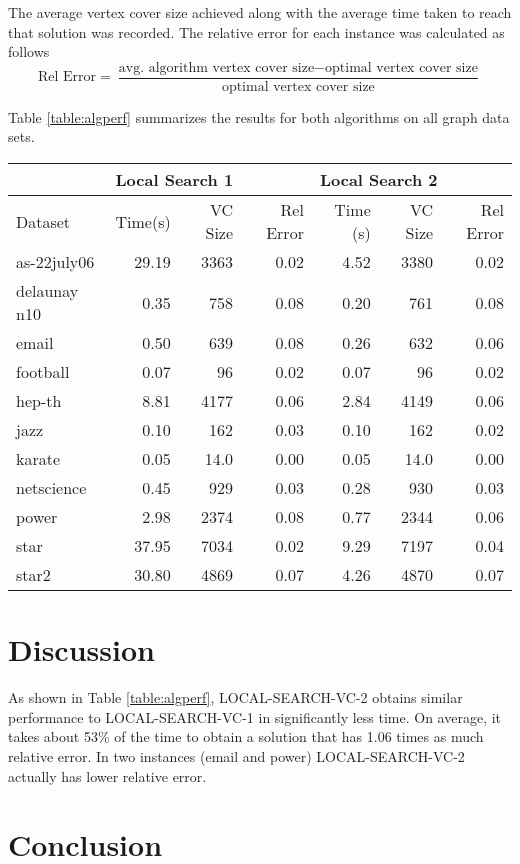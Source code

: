 \documentclass[sigconf]{acmart}
\begin{document}
The average vertex cover size achieved along with the average time taken to reach that solution was recorded. The relative error for each instance was calculated as follows
\begin{equation*}
	\textrm{Rel Error} = \frac{\textrm{avg. algorithm vertex cover size} - \textrm{optimal vertex cover size}}{\textrm{optimal vertex cover size}}
\end{equation*} 

Table \ref{table:algperf} summarizes the results for both algorithms on all graph data sets.

\begin{table*}[h]
	\caption{Algorithm Performance}
	\label{table:algperf}
	\begin{tabular}{lrrrrrr}
		\toprule
		& \multicolumn{3}{l}{Local Search 1} & \multicolumn{3}{l}{Local Search 2} \\ \midrule
		Dataset & Time(s)    & VC Size   & Rel Error  & Time (s)   & VC Size   & Rel Error  \\ \midrule
		as-22july06    & 29.19   & 3363      & 0.02   & 4.52   & 3380      & 0.02   \\
		delaunay n10    & 0.35   & 758      & 0.08   & 0.20   & 761      & 0.08   \\
		email    & 0.50   & 639      & 0.08   & 0.26   & 632      & 0.06   \\
		football    & 0.07   & 96      & 0.02   & 0.07   & 96      & 0.02   \\
		hep-th    & 8.81   & 4177      & 0.06   & 2.84   & 4149      & 0.06   \\
		jazz    & 0.10   & 162      & 0.03   & 0.10   & 162      & 0.02   \\
		karate    & 0.05   & 14.0      & 0.00   & 0.05   & 14.0      & 0.00   \\
		netscience    & 0.45   & 929      & 0.03   & 0.28   & 930      & 0.03   \\
		power    & 2.98   & 2374      & 0.08   & 0.77   & 2344      & 0.06   \\
		star    & 37.95   & 7034      & 0.02   & 9.29   & 7197      & 0.04   \\
		star2    & 30.80   & 4869      & 0.07   & 4.26   & 4870      & 0.07   \\
		\bottomrule
	\end{tabular}
\end{table*}

\section{Discussion}
As shown in Table \ref{table:algperf}, LOCAL-SEARCH-VC-2 obtains similar performance to LOCAL-SEARCH-VC-1 in significantly less time. On average, it takes about 53\% of the time to obtain a solution that has 1.06 times as much relative error. In two instances (email and power) LOCAL-SEARCH-VC-2 actually has lower relative error.

\section{Conclusion}


 
\end{document}
